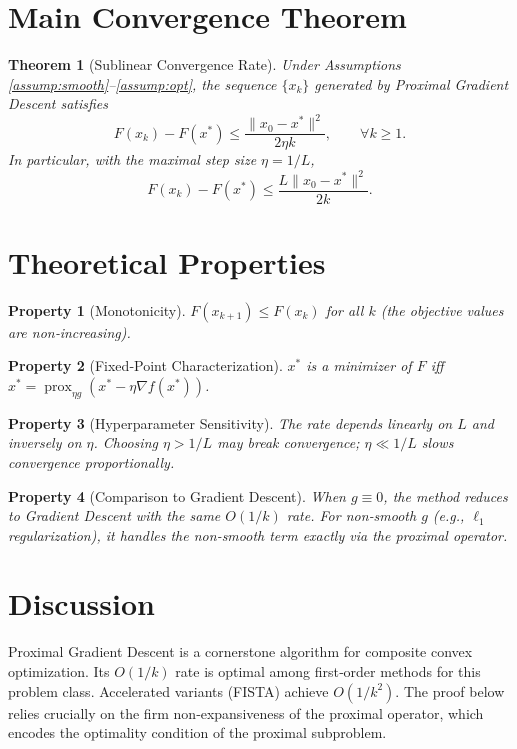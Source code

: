 \documentclass{article}
\newtheorem{theorem}{Theorem}
\newtheorem{property}{Property}
\begin{document}
\section*{Main Convergence Theorem}
\begin{theorem}[Sublinear Convergence Rate]\label{thm:rate}
Under Assumptions \ref{assump:smooth}--\ref{assump:opt}, the sequence $\{x_k\}$ generated by Proximal Gradient Descent satisfies
\[
F(x_k) - F(x^*) \le \frac{\|x_0 - x^*\|^2}{2\eta k}, \qquad \forall k \ge 1.
\]
In particular, with the maximal step size $\eta = 1/L$,
\[
F(x_k) - F(x^*) \le \frac{L \|x_0 - x^*\|^2}{2k}.
\]
\end{theorem}

\section*{Theoretical Properties}
\begin{property}[Monotonicity]
$F(x_{k+1}) \le F(x_k)$ for all $k$ (the objective values are non‑increasing).
\end{property}
\begin{property}[Fixed‑Point Characterization]
$x^*$ is a minimizer of $F$ iff $x^* = \operatorname{prox}_{\eta g}(x^* - \eta \nabla f(x^*))$.
\end{property}
\begin{property}[Hyperparameter Sensitivity]
The rate depends linearly on $L$ and inversely on $\eta$. Choosing $\eta > 1/L$ may break convergence; $\eta \ll 1/L$ slows convergence proportionally.
\end{property}
\begin{property}[Comparison to Gradient Descent]
When $g \equiv 0$, the method reduces to Gradient Descent with the same $O(1/k)$ rate. For non‑smooth $g$ (e.g., $\ell_1$ regularization), it handles the non‑smooth term exactly via the proximal operator.
\end{property}

\section*{Discussion}
Proximal Gradient Descent is a cornerstone algorithm for composite convex optimization. Its $O(1/k)$ rate is optimal among first‑order methods for this problem class. Accelerated variants (FISTA) achieve $O(1/k^2)$. The proof below relies crucially on the firm non‑expansiveness of the proximal operator, which encodes the optimality condition of the proximal subproblem.
\end{document}
